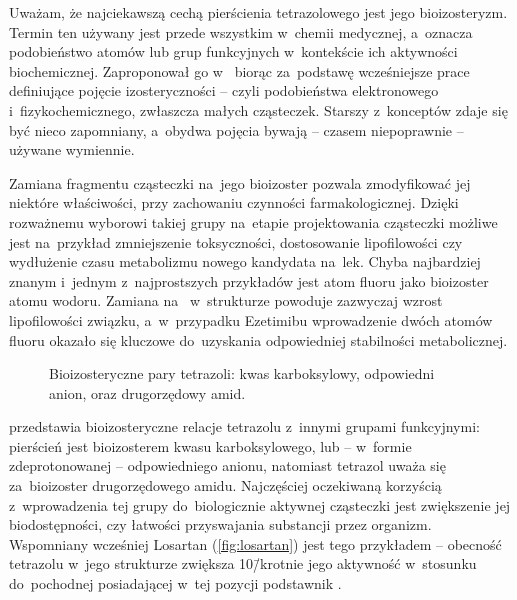 Uważam, że najciekawszą cechą pierścienia tetrazolowego jest jego bioizosteryzm.
Termin ten używany jest przede wszystkim w~chemii medycznej, a~oznacza podobieństwo atomów
  lub grup funkcyjnych w~kontekście ich aktywności biochemicznej.
Zaproponował go \citeauthor{friedman50} w~\citeyear{friedman50}
  biorąc za~podstawę wcześniejsze prace definiujące pojęcie izosteryczności \---
  czyli podobieństwa elektronowego i~fizykochemicznego, zwłaszcza małych cząsteczek.
Starszy z~konceptów zdaje się być nieco zapomniany, a~obydwa pojęcia bywają \---
  czasem niepoprawnie \--- używane wymiennie.

Zamiana fragmentu cząsteczki na~jego bioizoster pozwala zmodyfikować jej niektóre właściwości,
  przy zachowaniu czynności farmakologicznej.
Dzięki rozważnemu wyborowi takiej grupy na~etapie projektowania cząsteczki możliwe jest na~przykład
  zmniejszenie toksyczności, dostosowanie lipofilowości czy wydłużenie czasu metabolizmu
  nowego kandydata na~lek.
Chyba najbardziej znanym i~jednym z~najprostszych przykładów jest atom fluoru jako
  bioizoster atomu wodoru.
Zamiana  na~ w~strukturze powoduje zazwyczaj wzrost lipofilowości
  związku, a~w~przypadku Ezetimibu wprowadzenie dwóch atomów fluoru
  okazało się kluczowe do~uzyskania odpowiedniej stabilności metabolicznej.

\begin{figure}[b]
  
  \caption{
    Bioizosteryczne pary tetrazoli: kwas karboksylowy, odpowiedni anion, oraz drugorzędowy amid.
  }
  \label{fig:bioisosteres}
\end{figure}
 przedstawia bioizosteryczne relacje tetrazolu z~innymi grupami funkcyjnymi:
  pierścień  jest bioizosterem kwasu karboksylowego, lub \---
  w~formie zdeprotonowanej \--- odpowiedniego anionu, natomiast  tetrazol
  uważa się za~bioizoster drugorzędowego amidu.
Najczęściej oczekiwaną korzyścią z~wprowadzenia tej grupy do~biologicznie aktywnej cząsteczki
  jest zwiększenie jej biodostępności, czy łatwości przyswajania substancji przez organizm.
Wspomniany wcześniej Losartan (\cref{fig:losartan}) jest tego przykładem \---
  obecność tetrazolu w~jego strukturze zwiększa 10\=/krotnie jego aktywność w~stosunku
  do~pochodnej posiadającej w~tej pozycji podstawnik .

